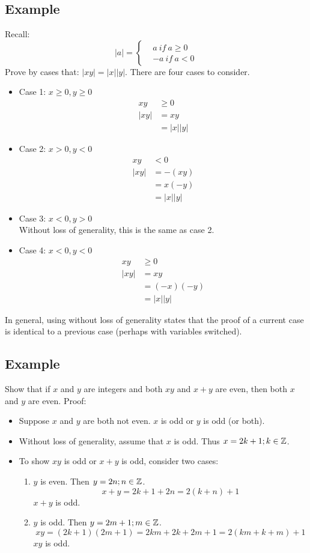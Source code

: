 \documentclass{math}
\begin{document}
\subsection*{Example}
Recall:
\[ |a| =
  \begin{cases}
    & a\ if\ a \geq 0 \\
    &-a\ if\ a < 0
  \end{cases}
\]
Prove by cases that: \( |xy| = |x||y| \). There are four cases to consider.
\begin{itemize}
  \item Case 1: \( x \geq 0, y \geq 0 \)
    \begin{align*}
      xy &\geq 0 \\
      |xy| &= xy \\
      &= |x||y|
    \end{align*}
  \item Case 2: \( x > 0, y < 0 \)
    \begin{align*}
      xy &< 0 \\
      |xy| &= -(xy) \\
      &= x(-y) \\
      &= |x||y|
    \end{align*}
  \item Case 3: \( x < 0, y > 0 \) \\
    Without loss of generality, this is the same as case 2.
  \item Case 4: \( x < 0, y < 0 \)
    \begin{align*}
      xy &\geq 0 \\
      |xy| &= xy \\
      &= (-x)(-y) \\
      &= |x||y|
    \end{align*}
\end{itemize}
In general, using without loss of generality states that the proof of a current
case is identical to a previous case (perhaps with variables switched).

\subsection*{Example}
Show that if \( x \) and \( y \) are integers and both \( xy \) and \( x+y \)
are even, then both \( x \) and \( y \) are even. Proof:
\begin{itemize}
  \item Suppose \( x \) and \( y \) are both not even. \( x \) is odd or \( y \)
    is odd (or both).
  \item Without loss of generality, assume that \( x \) is odd. Thus
    \( x = 2k+1; k\in\mathbb{Z} \).
  \item To show \( xy \) is odd or \( x+y \) is odd, consider two cases:
    \begin{enumerate}
      \item \( y \) is even. Then \( y = 2n; n\in\mathbb{Z} \).
      \[ x+y = 2k+1+2n = 2(k+n)+1 \]
      \( x+y \) is odd.
      \item \( y \) is odd. Then \( y = 2m+1; m\in\mathbb{Z} \).
      \[ xy = (2k+1)(2m+1) = 2km+2k+2m+1 = 2(km+k+m)+1 \]
      \( xy \) is odd.
    \end{enumerate}
\end{itemize}
\end{document}
